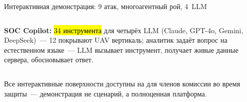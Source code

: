 \begin{frame}{Интерактивная демонстрация: 9 атак, многоагентный рой, 4~LLM}
\begin{columns}[T,onlytextwidth]
\medskip
\textbf{SOC Copilot:} \hl{34 инструмента} для четырёх LLM
(Claude, GPT-4o, Gemini, DeepSeek)~--- 12 покрывают UAV
вертикаль; аналитик задаёт вопрос на естественном языке~---
LLM вызывает инструмент, получает живые данные сервера,
обосновывает ответ.
\end{columns}

\medskip
\begin{block}{}
\footnotesize Все интерактивные поверхности доступны на
 для членов комиссии
во время защиты~--- демонстрация не сценарий, а полноценная
платформа.
\end{block}
\end{frame}
